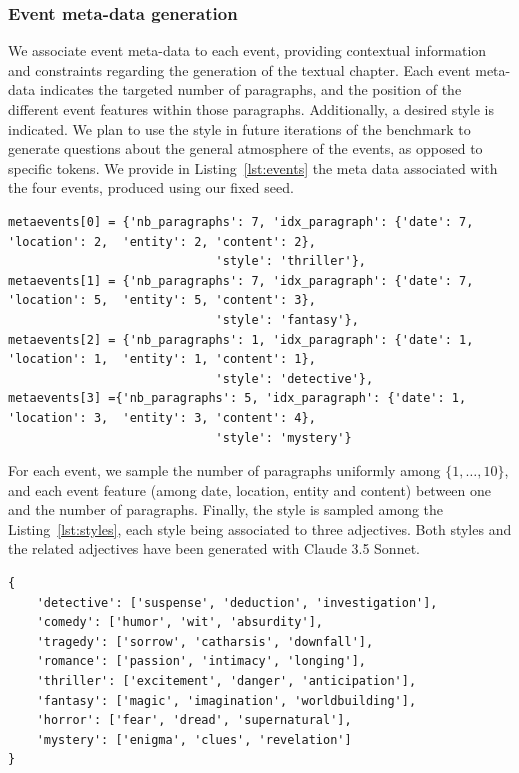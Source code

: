 \documentclass{article}
\begin{document}

\subsubsection{Event meta-data generation}\label{app:1book:metaevents_generation}

We associate event meta-data to each event, providing contextual information and constraints regarding the generation of the textual chapter.
Each event meta-data indicates the targeted number of paragraphs, and the position of the different event features within those paragraphs. Additionally, a desired style is indicated.
We plan to use the style in future iterations of the benchmark to generate questions about the general atmosphere of the events, as opposed to specific tokens.
We provide in Listing~\ref{lst:events} the meta data associated with the four events, produced using our fixed seed.

\begin{lstlisting}[style=mystyle, caption={Excerpt of the first four event meta-data.}, label={lst:metaevents}]
metaevents[0] = {'nb_paragraphs': 7, 'idx_paragraph': {'date': 7, 'location': 2,  'entity': 2, 'content': 2}, 
                             'style': 'thriller'},
metaevents[1] = {'nb_paragraphs': 7, 'idx_paragraph': {'date': 7, 'location': 5,  'entity': 5, 'content': 3}, 
                             'style': 'fantasy'},
metaevents[2] = {'nb_paragraphs': 1, 'idx_paragraph': {'date': 1, 'location': 1,  'entity': 1, 'content': 1}, 
                             'style': 'detective'}, 
metaevents[3] ={'nb_paragraphs': 5, 'idx_paragraph': {'date': 1, 'location': 3,  'entity': 3, 'content': 4}, 
                             'style': 'mystery'}
\end{lstlisting}

For each event, we sample the number of paragraphs uniformly among $\lbrace 1, \ldots, 10 \rbrace$, and each event feature (among date, location, entity and content) between one and the number of paragraphs. Finally, the style is sampled among the Listing~\ref{lst:styles}, each style being associated to three adjectives. Both styles and the related adjectives have been generated with Claude 3.5 Sonnet.

\begin{lstlisting}[style=mystyle, caption={List of the possible styles, with corresponding adjectives.}, label={lst:styles}]
{
    'detective': ['suspense', 'deduction', 'investigation'],
    'comedy': ['humor', 'wit', 'absurdity'],
    'tragedy': ['sorrow', 'catharsis', 'downfall'],
    'romance': ['passion', 'intimacy', 'longing'],
    'thriller': ['excitement', 'danger', 'anticipation'],
    'fantasy': ['magic', 'imagination', 'worldbuilding'],
    'horror': ['fear', 'dread', 'supernatural'],
    'mystery': ['enigma', 'clues', 'revelation']
}
\end{lstlisting}
\end{document}
